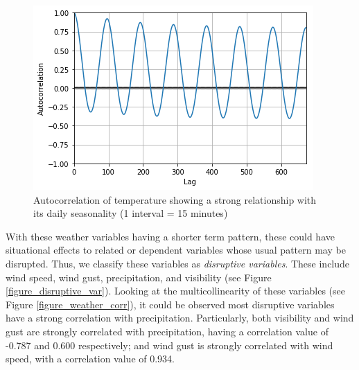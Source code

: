 \begin{figure}
  \includegraphics[width=\linewidth]{figures/figure_autocorr_temp.png}
  \caption{Autocorrelation of temperature showing a strong relationship with its daily seasonality (1 interval = 15 minutes)}
  \label{figure_autocorr_temp}
\end{figure}









With these weather variables having a shorter term pattern, these could have situational effects to related or dependent variables whose usual pattern may be disrupted. Thus, we classify these variables as \textit{disruptive variables}. These include wind speed, wind gust, precipitation, and visibility (see Figure \ref{figure_disruptive_var}). Looking at the multicollinearity of these variables (see Figure \ref{figure_weather_corr}), it could be observed most disruptive variables have a strong correlation with precipitation. Particularly, both visibility and wind gust are strongly correlated with precipitation, having a correlation value of -0.787 and 0.600 respectively; and wind gust is strongly correlated with wind speed, with a correlation value of 0.934.


